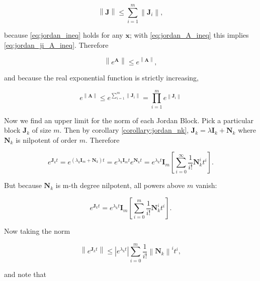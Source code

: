 \begin{equation} \left\lVert \mathbf{J}\right\rVert \leq  \sum_{i=1}^m \left\lVert\mathbf{J}_i\right\rVert , \end{equation}

	\noindent because \eqref{eq:jordan_ineq} holds for any $\mathbf{x}$; with \eqref{eq:jordan_A_ineq} this implies \eqref{eq:jordan_ji_A_ineq}. Therefore

\begin{equation} \left\lVert e^\mathbf{A}\right\rVert \leq e^{\left\lVert\mathbf{A}\right\rVert}, \end{equation}

	\noindent and because the real exponential function is strictly increasing,

\begin{equation} e^{\left\lVert\mathbf{A}\right\rVert} \leq  e^{\sum_{i=1}^m \left\lVert\mathbf{J}_i\right\rVert} = \prod_{i=1}^m e^{\left\lVert\mathbf{J}_i\right\rVert} \end{equation}

	Now we find an upper limit for the norm of each Jordan Block. Pick a particular block $\mathbf{J}_k$ of size $m$. Then by corollary \ref{corollary:jordan_nk}, $\mathbf{J}_k = \lambda \mathbf{I}_k + \mathbf{N}_k$ where $\mathbf{N}_k$ is nilpotent of order $m$. Therefore

\begin{equation} e^{\mathbf{J}_kt} = e^{\left(\lambda_k\mathbf{I}_m + \mathbf{N}_k\right)t} = e^{\lambda_k\mathbf{I}_m t}e^{\mathbf{N}_k t} = e^{\lambda_k t} \mathbf{I}_m \left[\sum_{i=0}^\infty \dfrac{1}{i!} \mathbf{N}_k^i t^i\right] .\end{equation} 

	But because $\mathbf{N}_k$ is m-th degree nilpotent, all powers above $m$ vanish:

\begin{equation} e^{\mathbf{J}_kt} = e^{\lambda_k t} \mathbf{I}_m \left[\sum_{i=0}^m \dfrac{1}{i!} \mathbf{N}_k^i t^i\right] .\end{equation} 

	Now taking the norm

\begin{equation}\left\lVert e^{\mathbf{J}_kt}\right\rVert \leq \left\lvert e^{\lambda_k t} \right\rvert \sum_{i=0}^m \dfrac{1}{i!} \left\lVert \mathbf{N}_k \right\rVert^i t^i,\end{equation} 

	\noindent and note that

